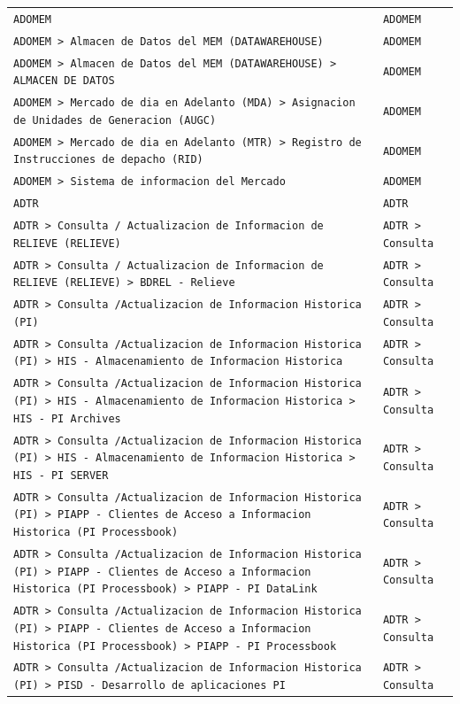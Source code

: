 \begin{longtable}{>{\raggedright\arraybackslash}p{} >{\raggedright\arraybackslash}p{}}
\texttt{ADOMEM} & \texttt{ADOMEM} \\
\texttt{ADOMEM > Almacen de Datos del MEM (DATAWAREHOUSE)} & \texttt{ADOMEM} \\
\texttt{ADOMEM > Almacen de Datos del MEM (DATAWAREHOUSE) > ALMACEN DE DATOS} & \texttt{ADOMEM} \\
\texttt{ADOMEM > Mercado de dia en Adelanto  (MDA) > Asignacion de Unidades de Generacion (AUGC)} & \texttt{ADOMEM} \\
\texttt{ADOMEM > Mercado de dia en Adelanto (MTR) > Registro de Instrucciones  de depacho (RID)} & \texttt{ADOMEM} \\
\texttt{ADOMEM > Sistema de informacion del Mercado} & \texttt{ADOMEM} \\
\texttt{ADTR} & \texttt{ADTR} \\
\texttt{ADTR > Consulta / Actualizacion de Informacion de RELIEVE (RELIEVE)} & \texttt{ADTR > Consulta} \\
\texttt{ADTR > Consulta / Actualizacion de Informacion de RELIEVE (RELIEVE) > BDREL - Relieve} & \texttt{ADTR > Consulta} \\
\texttt{ADTR > Consulta /Actualizacion de Informacion Historica (PI)} & \texttt{ADTR > Consulta} \\
\texttt{ADTR > Consulta /Actualizacion de Informacion Historica (PI) > HIS - Almacenamiento de Informacion Historica} & \texttt{ADTR > Consulta} \\
\texttt{ADTR > Consulta /Actualizacion de Informacion Historica (PI) > HIS - Almacenamiento de Informacion Historica > HIS - PI Archives} & \texttt{ADTR > Consulta} \\
\texttt{ADTR > Consulta /Actualizacion de Informacion Historica (PI) > HIS - Almacenamiento de Informacion Historica > HIS - PI SERVER} & \texttt{ADTR > Consulta} \\
\texttt{ADTR > Consulta /Actualizacion de Informacion Historica (PI) > PIAPP - Clientes de Acceso a Informacion Historica (PI Processbook)} & \texttt{ADTR > Consulta} \\
\texttt{ADTR > Consulta /Actualizacion de Informacion Historica (PI) > PIAPP - Clientes de Acceso a Informacion Historica (PI Processbook) > PIAPP - PI DataLink} & \texttt{ADTR > Consulta} \\
\texttt{ADTR > Consulta /Actualizacion de Informacion Historica (PI) > PIAPP - Clientes de Acceso a Informacion Historica (PI Processbook) > PIAPP - PI Processbook} & \texttt{ADTR > Consulta} \\
\texttt{ADTR > Consulta /Actualizacion de Informacion Historica (PI) > PISD - Desarrollo de aplicaciones PI} & \texttt{ADTR > Consulta} \\

\end{longtable}

